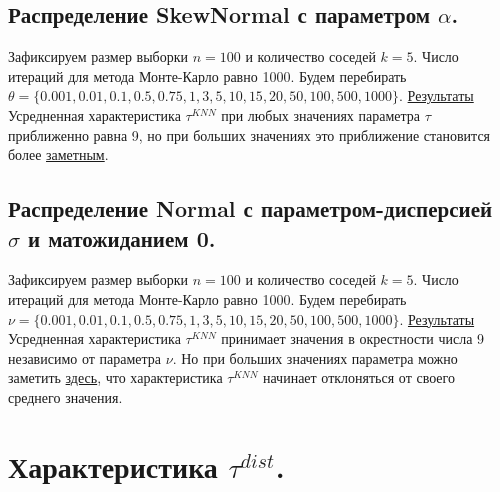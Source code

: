 \documentclass{report}
\begin{document}
\subsection{Распределение SkewNormal с параметром $\alpha$.}
Зафиксируем размер выборки $n = 100$ и количество соседей $k = 5$. Число итераций для метода Монте-Карло равно 1000.
\newline
\newline
Будем перебирать $\theta = \{0.001, 0.01, 0.1, 0.5, 0.75, 1, 3, 5, 10, 15, 20, 50, 100, 500, 1000\}$.
\newline
\newline
\href{https://github.com/misshimichka/dm-random-graphs/blob/fbf3dd1bec269816312776019ca766ef0ce871b6/report/fix_construct_skewnorm_max_deg_knn.png}{Результаты}
\newline
\newline
Усредненная характеристика $\tau^{KNN}$ при любых значениях параметра $\tau$ приближенно равна 9, но при больших значениях это приближение становится более \href{https://github.com/misshimichka/dm-random-graphs/blob/dmitrii/report/report/fix_construct_skewnorm_alpha2avg_max_deg_knn.png}{заметным}. 

\subsection{Распределение Normal с параметром-дисперсией $\sigma$ и матожиданием 0.}
Зафиксируем размер выборки $n = 100$ и количество соседей $k = 5$. Число итераций для метода Монте-Карло равно 1000.
\newline
\newline
Будем перебирать $\nu = \{0.001, 0.01, 0.1, 0.5, 0.75, 1, 3, 5, 10, 15, 20, 50, 100, 500, 1000\}$.
\newline
\newline
\href{https://github.com/misshimichka/dm-random-graphs/blob/dmitrii/report/report/fix_construct_norm_max_deg_knn.png}{Результаты}
\newline
\newline
Усредненная характеристика $\tau^{KNN}$ принимает значения в окрестности числа 9 независимо от параметра $\nu$. Но при больших значениях параметра можно заметить \href{https://github.com/misshimichka/dm-random-graphs/blob/dmitrii/report/report/fix_construct_norm_sigma2avg_max_deg_knn.png}{здесь}, что характеристика $\tau^{KNN}$ начинает отклоняться от своего среднего значения.

\section{Характеристика $\tau^{dist}$.}
\end{document}
